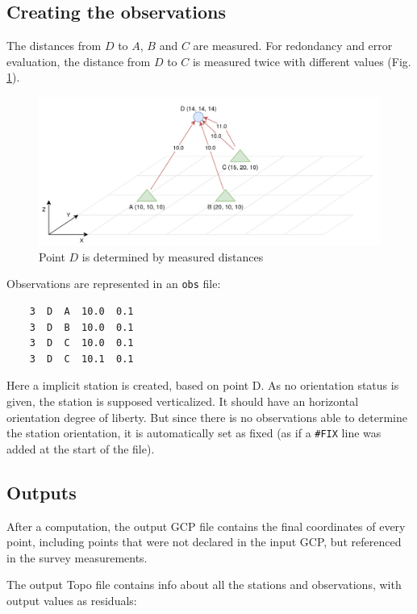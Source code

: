\subsection{Creating the observations}

The distances from $D$ to $A$, $B$ and $C$
are measured. For redondancy and error evaluation, the distance from $D$ to $C$ is measured twice
with different values (Fig. \ref{fig:topoEx2}).

\begin{figure}[!h]
\centering
\includegraphics[width=12cm]{Programmer/benchtopo2.png}
\caption{Point $D$ is determined by measured distances}
\label{fig:topoEx2}
\end{figure}

Observations are represented in an {\tt obs} file:
\begin{lstlisting}
    3  D  A  10.0  0.1
    3  D  B  10.0  0.1
    3  D  C  10.0  0.1
    3  D  C  10.1  0.1
\end{lstlisting}

Here a implicit station is created, based on point D.
As no orientation status is given, the station is supposed verticalized.
It should have an horizontal orientation degree of liberty.
But since there is no observations able to determine the station orientation,
it is automatically set as fixed (as if a {\tt \#FIX} line was added at the start of the file).

\subsection{Outputs}

After a computation, the output GCP file contains the final coordinates of every point, including
points that were not declared in the input GCP, but referenced in the survey measurements.

The output Topo file contains info about all the stations and observations,
with output values as residuals:

